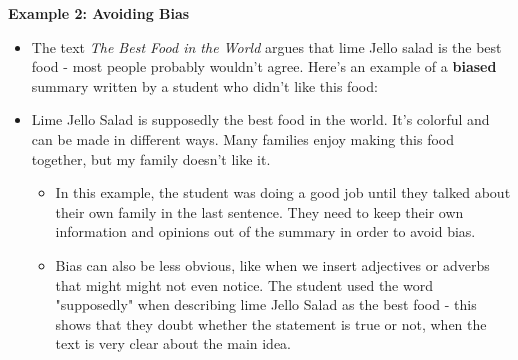 \documentclass[12pt]{article}
\begin{document}
\begin{tcolorbox}[colframe=black!60, colback=white, 
coltitle=black, colbacktitle=black!15, fonttitle=\bfseries\Large, 
title=Examples, halign title=center, left=10pt, right=10pt, top=10pt, bottom=15pt]

\textbf{Example 2: Avoiding Bias}
\begin{itemize}

    \item The text \textit{The Best Food in the World} argues that lime Jello salad is the best food - most people probably wouldn't agree. Here's an example of a \textbf{biased} summary written by a student who didn't like this food: 
    \item Lime Jello Salad is supposedly the best food in the world. It's colorful and can be made in different ways. Many families enjoy making this food together, but my family doesn't like it.
    \begin{itemize}
        \item In this example, the student was doing a good job until they talked about their own family in the last sentence. They need to keep their own information and opinions out of the summary in order to avoid bias.
        \item Bias can also be less obvious, like when we insert adjectives or adverbs that might might not even notice. The student used the word "supposedly" when describing lime Jello Salad as the best food - this shows that they doubt whether the statement is true or not, when the text is very clear about the main idea.
        
     
    \end{itemize}
    \end{itemize}


\end{tcolorbox}
\end{document}
